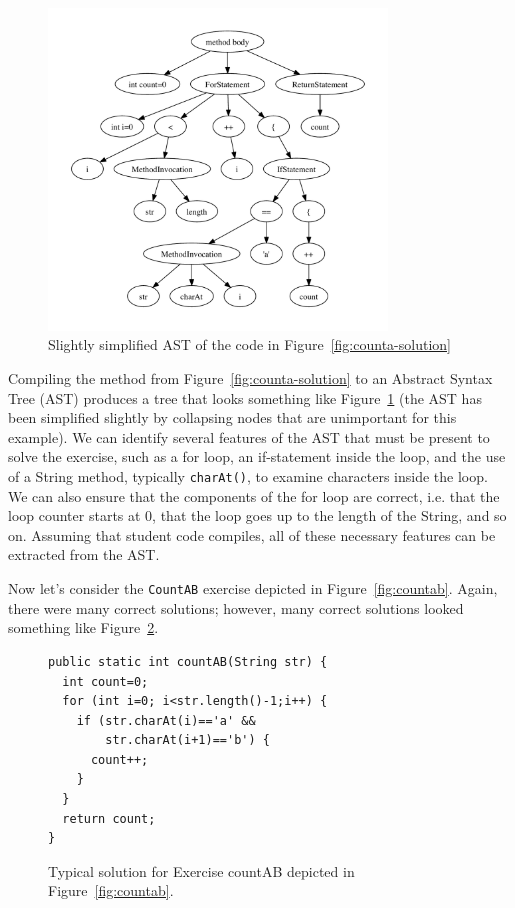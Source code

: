 \documentclass{sig-alternate}
\begin{document}
\begin{figure}
\includegraphics[width=90mm]{images/countA.pdf}
\caption{Slightly simplified AST of the code in Figure~\ref{fig:counta-solution}}
\label{fig:counta-ast}
\end{figure}

Compiling the method from Figure~\ref{fig:counta-solution} to an
Abstract Syntax Tree (AST) produces a tree that looks something like
Figure~\ref{fig:counta-ast} (the AST has been simplified slightly by
collapsing nodes that are unimportant for this example).  We can identify
several features of the AST that must be present to solve the
exercise, such as a for loop, an if-statement inside the loop, and
the use of a String method, typically {\tt charAt()}, to examine
characters inside the loop.  We can also ensure that the components of
the for loop are correct, i.e. that the loop counter starts at 0, that
the loop goes up to the length of the String, and so on.  Assuming
that student code compiles, all of these necessary features can be
extracted from the AST. 

Now let's consider the {\tt CountAB} exercise depicted in
Figure~\ref{fig:countab}.  Again, there were many correct solutions;
however, many correct solutions looked something like
Figure~\ref{fig:countab-solution}.  

\begin{figure}[h]
\begin{lstlisting}
public static int countAB(String str) {
  int count=0;
  for (int i=0; i<str.length()-1;i++) {
    if (str.charAt(i)=='a' && 
        str.charAt(i+1)=='b') {
      count++;
    }
  }
  return count;
}
\end{lstlisting}
\caption{Typical solution for Exercise countAB depicted in Figure~\ref{fig:countab}.}
\label{fig:countab-solution}
\end{figure}
\end{document}
